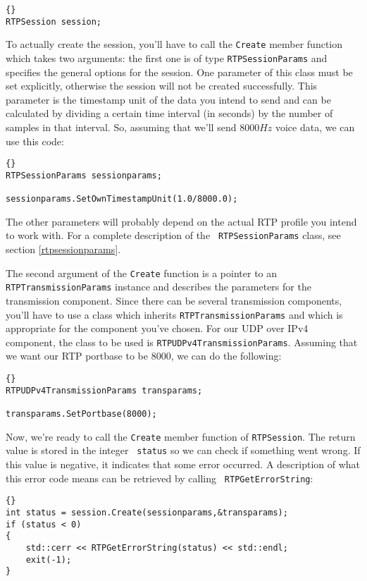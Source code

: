\documentclass[12pt,a4paper]{article}
\begin{document}
            \begin{lstlisting}[frame=tb]{} 
RTPSession session; 
			\end{lstlisting}

			To actually create the session, you'll have to call the {\tt Create}
			member function which takes two arguments: the first one is of type
			{\tt RTPSession\-Params} and specifies the general options for
			the session. One parameter of this class must be set explicitly,
			otherwise the session will not be created successfully. This
			parameter is the timestamp unit of the data you intend to send and
			can be calculated by dividing a certain time interval (in seconds)
			by the number of samples in that interval. So, assuming that we'll
			send $8000 Hz$ voice data, we can use this code:

            \begin{lstlisting}[frame=tb]{} 
RTPSessionParams sessionparams;

sessionparams.SetOwnTimestampUnit(1.0/8000.0);
			\end{lstlisting}
			The other parameters will probably depend on the actual RTP profile
			you intend to work with. For a complete description of the {\tt
			RTPSession\-Params} class, see section \ref{rtpsessionparams}.

			The second argument of the {\tt Create} function is a pointer to
			an {\tt RTPTrans\-mission\-Params} instance and describes the
			parameters for the transmission component. Since there can be
			several transmission components, you'll have to use a class which
			inherits {\tt RTPTrans\-mission\-Params} and which is appropriate
			for the component you've chosen. For our UDP over IPv4 component,
			the class to be used is {\tt RTPUDPv4Trans\-mission\-Params}.
			Assuming that we want our RTP portbase to be $8000$, we can do the
			following:
			\begin{lstlisting}[frame=tb]{}
RTPUDPv4TransmissionParams transparams;

transparams.SetPortbase(8000);
			\end{lstlisting}

			Now, we're ready to call the {\tt Create} member function of
			{\tt RTPSession}. The return value is stored in the integer {\tt
			status} so we can check if something went wrong. If this value is
			negative, it indicates that some error occurred. A description
			of what this error code means can be retrieved by calling {\tt
			RTPGetErrorString}:
			\begin{lstlisting}[frame=tb]{}
int status = session.Create(sessionparams,&transparams);
if (status < 0)
{
	std::cerr << RTPGetErrorString(status) << std::endl;
	exit(-1);
}
			\end{lstlisting}
			
\end{document}
